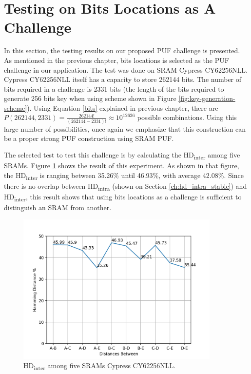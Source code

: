 \section{Testing on Bits Locations as A Challenge}
In this section, the testing results on our proposed PUF challenge is presented. As mentioned in the previous chapter, bits locations is selected as the PUF challenge in our application. The test was done on SRAM Cypress CY62256NLL. Cypress CY62256NLL itself has a capacity to store 262144 bits. The number of bits required in a challenge is 2331 bits (the length of the bits required to generate 256 bits key when using scheme shown in Figure \ref{fig:key-generation-scheme}). Using Equation \ref{bits} explained in previous chapter, there are $P(262144, 2331)=\frac{262144!}{\left( 262144-2331 \right) !}\approx 10^{12626}$ possible combinations. Using this large number of possibilities, once again we emphasize that this construction can be a proper strong PUF construction using SRAM PUF.

The selected test to test this challenge is by calculating the HD\textsubscript{inter} among five SRAMs. Figure \ref{fig:cy62256cy62256nll_hd_inter_stable_remanences} shows the result of this experiment. As shown in that figure, the HD\textsubscript{inter} is ranging between 35.26\% until 46.93\%, with average 42.08\%. Since there is no overlap between HD\textsubscript{intra} (shown on Section \ref{ch:hd_intra_stable}) and HD\textsubscript{inter}, this result shows that using bits locations as a challenge is sufficient to distinguish an SRAM from another.

\begin{figure}[tph!]
    \centerline{\includegraphics[width={0.9\textwidth}]{images/cy62256nll_hd_inter_stable_remanences}}
    \caption{HD\textsubscript{inter} among five SRAMs Cypress CY62256NLL. }
    \label{fig:cy62256cy62256nll_hd_inter_stable_remanences}
\end{figure}

